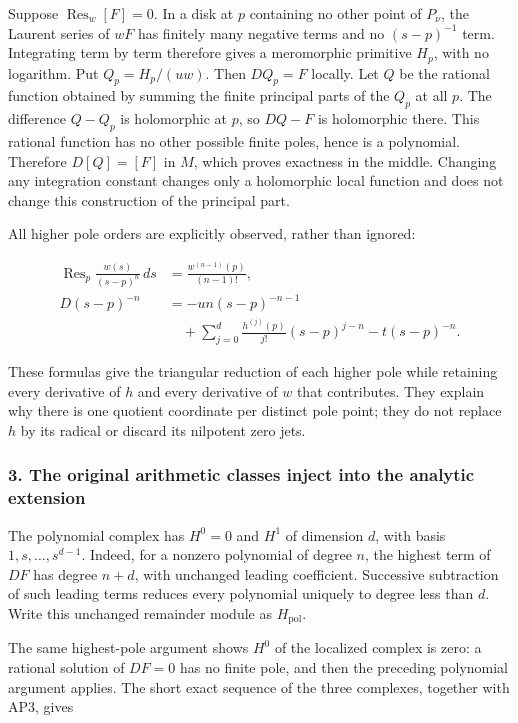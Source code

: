 Suppose \(\operatorname{Res}_w[F]=0\). In a disk at \(p\) containing no other point of \(P_{\nu}\), the Laurent series of \(wF\) has finitely many negative terms and no \((s-p)^{-1}\) term. Integrating term by term therefore gives a meromorphic primitive \(H_p\), with no logarithm. Put \(Q_p=H_p/(u w)\). Then \(D Q_p=F\) locally. Let \(Q\) be the rational function obtained by summing the finite principal parts of the \(Q_p\) at all \(p\). The difference \(Q-Q_p\) is holomorphic at \(p\), so \(DQ-F\) is holomorphic there. This rational function has no other possible finite poles, hence is a polynomial. Therefore \(D[Q]=[F]\) in \(M\), which proves exactness in the middle. Changing any integration constant changes only a holomorphic local function and does not change this construction of the principal part.

All higher pole orders are explicitly observed, rather than ignored:

\[
\begin{aligned}
\operatorname{Res}_p\frac{w(s)}{(s-p)^n}\,ds
&=\frac{w^{(n-1)}(p)}{(n-1)!},\\
D(s-p)^{-n}&=-u n(s-p)^{-n-1}\\
&\quad+\sum_{j=0}^d\frac{h^{(j)}(p)}{j!}(s-p)^{j-n}
-t(s-p)^{-n}.
\end{aligned}
\tag{AP4}
\]

These formulas give the triangular reduction of each higher pole while retaining every derivative of \(h\) and every derivative of \(w\) that contributes. They explain why there is one quotient coordinate per distinct pole point; they do not replace \(h\) by its radical or discard its nilpotent zero jets.

\subsubsection{3. The original arithmetic classes inject into the analytic extension}\label{endpoint-analytic_pole--the-original-arithmetic-classes-inject-into-the-analytic-extension}

The polynomial complex has \(H^0=0\) and \(H^1\) of dimension \(d\), with basis \(1,s,\ldots,s^{d-1}\). Indeed, for a nonzero polynomial of degree \(n\), the highest term of \(DF\) has degree \(n+d\), with unchanged leading coefficient. Successive subtraction of such leading terms reduces every polynomial uniquely to degree less than \(d\). Write this unchanged remainder module as \(H_{\mathrm{pol}}\).

The same highest-pole argument shows \(H^0\) of the localized complex is zero: a rational solution of \(DF=0\) has no finite pole, and then the preceding polynomial argument applies. The short exact sequence of the three complexes, together with AP3, gives

